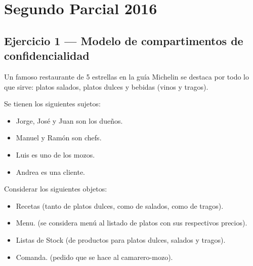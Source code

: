 \section{Segundo Parcial 2016}

\subsection{Ejercicio 1 --- Modelo de compartimentos de confidencialidad}

\begin{consigna}
Un famoso restaurante de 5 estrellas en la guía Michelin se destaca por todo lo que sirve:
platos salados, platos dulces y bebidas (vinos y tragos).

Se tienen los siguientes sujetos:
\begin{itemize}
  \item Jorge, José y Juan son los dueños.
  \item Manuel y Ramón son chefs.
  \item Luis es uno de los mozos.
  \item Andrea es una cliente.
\end{itemize}

Considerar los siguientes objetos:
\begin{itemize}
  \item Recetas (tanto de platos dulces, como de salados, como de tragos).
  \item Menu. (se considera menú al listado de platos con sus respectivos precios).
  \item Listas de Stock (de productos para platos dulces, salados y tragos).
  \item Comanda. (pedido que se hace al camarero-mozo).
\end{itemize}


\end{consigna}

